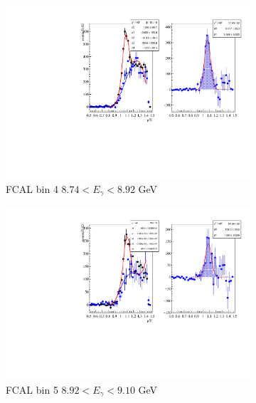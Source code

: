 \documentclass[%
preprint,
nofootinbib,
 amsmath,amssymb,
 aps,
floatfix,
]{revtex4-1}
\begin{document}
\begin{figure}[h]
  \begin{subfigure}[b]{0.49\textwidth}
    \includegraphics[width=\textwidth]{./fig/AN2_PovE_FCAL_bin4.pdf}
    \caption{FCAL bin 4 $8.74<E_\gamma <8.92$ GeV}
    \label{fig:FCALbin4}
  \end{subfigure}
  \begin{subfigure}[b]{0.49\textwidth}
    \includegraphics[width=\textwidth]{./fig/AN2_PovE_FCAL_bin5.pdf}
    \caption{FCAL bin 5 $8.92<E_\gamma <9.10$ GeV}
    \label{fig:FCALbin5}
  \end{subfigure}
  \begin{subfigure}[b]{0.49\textwidth}

\end{subfigure}
\end{figure}
\end{document}
